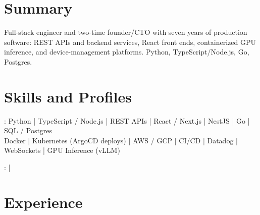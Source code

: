 \documentclass[print]{jack-resume}
\begin{document}
\pagecolor{darkmodeBackground}


\begin{minipage}[t][1cm][t]{.03\textwidth}
    \hfill
\end{minipage}

\section{Summary}
Full-stack engineer and two-time founder/CTO with seven years of production software: REST APIs and backend services, React front ends, containerized GPU inference, and device-management platforms. Python, TypeScript/Node.js, Go, Postgres.
\sectionsep

\section{Skills and Profiles}
:
Python \hfill | \hfill
TypeScript / Node.js \hfill | \hfill
REST APIs \hfill | \hfill
React / Next.js \hfill | \hfill
NestJS \hfill | \hfill
Go \hfill | \hfill
SQL / Postgres \\
\hspace{1.0cm} Docker \hfill | \hfill
Kubernetes (ArgoCD deploys) \hfill | \hfill
AWS / GCP \hfill | \hfill
CI/CD \hfill | \hfill
Datadog \hfill | \hfill
WebSockets \hfill | \hfill
GPU Inference (vLLM) \\

\raggedright{
    :
      \href{https://www.linkedin.com/in/jack-sturtevant/}{ \ExternalLink} |
     \href{https://github.com/jacksturt}{ \ExternalLink}}

\section{Experience}
\end{document}
